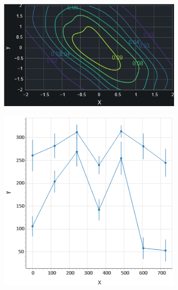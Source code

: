 \begin{figure}
\begin{subfigure}[b]{0.32\textwidth}
    \end{subfigure}
    \hfill
    \begin{subfigure}[b]{0.32\textwidth}
        \centering
        \includegraphics[width=\textwidth]{figures/body/procedure/contour.png}
    \end{subfigure}
    \centering
    \begin{subfigure}[b]{0.32\textwidth}
        \centering
        \includegraphics[width=\textwidth]{figures/body/procedure/error.png}
    \end{subfigure}
    \hfill
    \begin{subfigure}[b]{0.32\textwidth}

\end{subfigure}
\end{figure}
